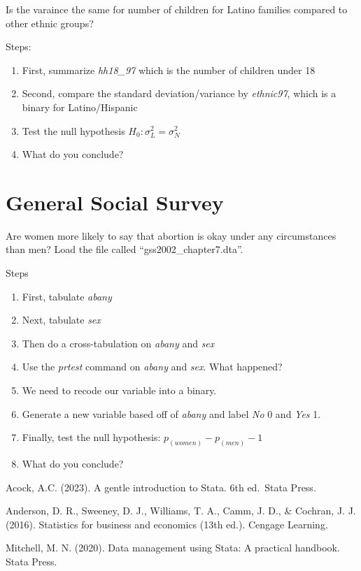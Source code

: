 \documentclass[
]{book}
\providecommand{\tightlist}{%
  \setlength{\itemsep}{0pt}\setlength{\parskip}{0pt}}
\begin{document}
Is the varaince the same for number of children for Latino families compared to other ethnic groups?

Steps:

\begin{enumerate}
\def\labelenumi{\arabic{enumi}.}
\tightlist
\item
  First, summarize \emph{hh18\_97} which is the number of children under 18
\item
  Second, compare the standard deviation/variance by \emph{ethnic97}, which is a binary for Latino/Hispanic
\item
  Test the null hypothesis \(H_{0}: \sigma^2_{L} = \sigma^2_{N}\)
\item
  What do you conclude?
\end{enumerate}

\section{General Social Survey}\label{general-social-survey}

Are women more likely to say that abortion is okay under any circumstances than men? Load the file called ``gss2002\_chapter7.dta''.

Steps

\begin{enumerate}
\def\labelenumi{\arabic{enumi}.}
\tightlist
\item
  First, tabulate \emph{abany}
\item
  Next, tabulate \emph{sex}
\item
  Then do a cross-tabulation on \emph{abany} and \emph{sex}
\item
  Use the \emph{prtest} command on \emph{abany} and \emph{sex}. What happened?
\item
  We need to recode our variable into a binary.
\item
  Generate a new variable based off of \emph{abany} and label \emph{No} 0 and \emph{Yes} 1.
\item
  Finally, test the null hypothesis: \(p_{(women)}-p_{(men)}-1\)
\item
  What do you conclude?
\end{enumerate}

Acock, A.C. (2023). A gentle introduction to Stata. 6th ed.~Stata Press.

Anderson, D. R., Sweeney, D. J., Williams, T. A., Camm, J. D., \& Cochran, J. J. (2016). Statistics for business and economics (13th ed.). Cengage Learning.

Mitchell, M. N. (2020). Data management using Stata: A practical handbook. Stata Press.


\end{document}
